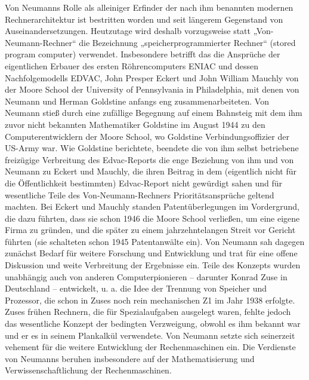 Von Neumanns Rolle als alleiniger Erfinder der nach ihm benannten modernen Rechnerarchitektur ist bestritten worden und seit längerem Gegenstand von Auseinandersetzungen. Heutzutage wird deshalb vorzugsweise statt „Von-Neumann-Rechner“ die Bezeichnung „speicherprogrammierter Rechner“ (stored program computer) verwendet. Insbesondere betrifft das die Ansprüche der eigentlichen Erbauer des ersten Röhrencomputers ENIAC und dessen Nachfolgemodells EDVAC, John Presper Eckert und John William Mauchly von der Moore School der University of Pennsylvania in Philadelphia, mit denen von Neumann und Herman Goldstine anfangs eng zusammenarbeiteten. Von Neumann stieß durch eine zufällige Begegnung auf einem Bahnsteig mit dem ihm zuvor nicht bekannten Mathematiker Goldstine im August 1944 zu den Computerentwicklern der Moore School, wo Goldstine Verbindungsoffizier der US-Army war. Wie Goldstine berichtete, beendete die von ihm selbst betriebene freizügige Verbreitung des Edvac-Reports die enge Beziehung von ihm und von Neumann zu Eckert und Mauchly, die ihren Beitrag in dem (eigentlich nicht für die Öffentlichkeit bestimmten) Edvac-Report nicht gewürdigt sahen und für wesentliche Teile des Von-Neumann-Rechners Prioritätsansprüche geltend machten. Bei Eckert und Mauchly standen Patentüberlegungen im Vordergrund, die dazu führten, dass sie schon 1946 die Moore School verließen, um eine eigene Firma zu gründen, und die später zu einem jahrzehntelangen Streit vor Gericht führten (sie schalteten schon 1945 Patentanwälte ein). Von Neumann sah dagegen zunächst Bedarf für weitere Forschung und Entwicklung und trat für eine offene Diskussion und weite Verbreitung der Ergebnisse ein. Teile des Konzepts wurden unabhängig auch von anderen Computerpionieren – darunter Konrad Zuse in Deutschland – entwickelt, u. a. die Idee der Trennung von Speicher und Prozessor, die schon in Zuses noch rein mechanischen Z1 im Jahr 1938 erfolgte. Zuses frühen Rechnern, die für Spezialaufgaben ausgelegt waren, fehlte jedoch das wesentliche Konzept der bedingten Verzweigung, obwohl es ihm bekannt war und er es in seinem Plankalkül verwendete. Von Neumann setzte sich seinerzeit vehement für die weitere Entwicklung der Rechenmaschinen ein. Die Verdienste von Neumanns beruhen insbesondere auf der Mathematisierung und Verwissenschaftlichung der Rechenmaschinen.\cite{vna}

